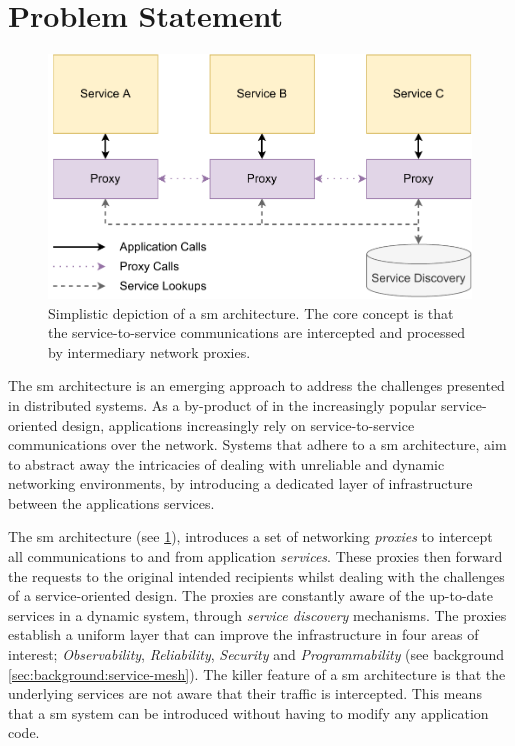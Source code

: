 \section{Problem Statement}
\label{sec:introduction:problem-statement}


\begin{figure}[!t]
    \centering
    
    \includegraphics[width=.8\linewidth]{1_introduction/figures/service-mesh-architecture-simple.pdf}

    \caption[Simplistic depiction of a \gls{sm} architecture]{Simplistic depiction of a \gls{sm} architecture. The core concept is that the service-to-service communications are intercepted and processed by intermediary network proxies.}
    \label{fig:service-mesh-architecture-simplified}
\end{figure}

The \gls{sm} architecture is an emerging approach to address the challenges presented in distributed systems. As a by-product of in the increasingly popular service-oriented design, applications increasingly rely on service-to-service communications over the network. Systems that adhere to a \gls{sm} architecture, aim to abstract away the intricacies of dealing with unreliable and dynamic networking environments, by introducing a dedicated layer of infrastructure between the applications services. 

The \gls{sm} architecture (see \cref{fig:service-mesh-architecture-simplified}), introduces a set of networking \textit{proxies} to intercept all communications to and from application \textit{services}. These proxies then forward the requests to the original intended recipients whilst dealing with the challenges of a service-oriented design. The proxies are constantly aware of the up-to-date services in a dynamic system, through \textit{service discovery} mechanisms. The proxies establish a uniform layer that can improve the infrastructure in four areas of interest; \textit{Observability}, \textit{Reliability}, \textit{Security} and \textit{Programmability} (see background \cref{sec:background:service-mesh}). The killer feature of a \gls{sm}  architecture is that the underlying services are not aware that their traffic is intercepted. This means that a \gls{sm} system can be introduced without having to modify any application code.

